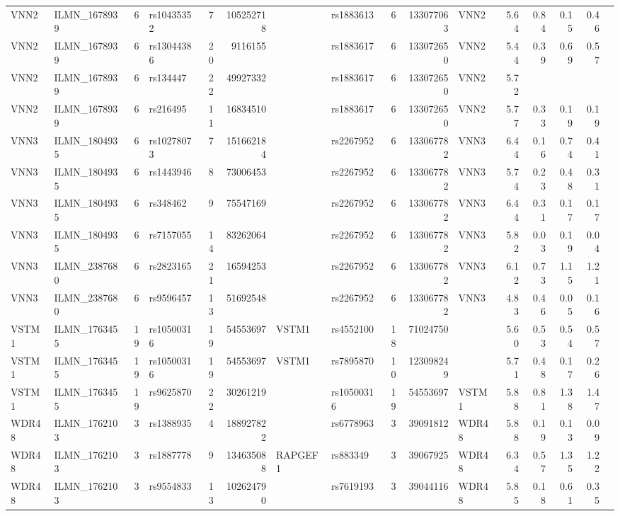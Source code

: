 \documentclass{article}
\begin{document}
\begin{landscape}
{\begin{ThreePartTable}
\begin{longtable}{|llr|lrrl|lrrl|rrrr|r|}
VNN2 & ILMN\_1678939 & 6 & rs10435352 & 7 & 105252718 &  & rs1883613 & 6 & 133077063 & VNN2 & 5.64 & 0.84 & 0.15 & 0.46 &  \\
VNN2 & ILMN\_1678939 & 6 & rs13044386 & 20 & 9116155 &  & rs1883617 & 6 & 133072650 & VNN2 & 5.44 & 0.39 & 0.69 & 0.57 &  \\
VNN2 & ILMN\_1678939 & 6 & rs134447 & 22 & 49927332 &  & rs1883617 & 6 & 133072650 & VNN2 & 5.72 &  &  &  &  \\
VNN2 & ILMN\_1678939 & 6 & rs216495 & 11 & 16834510 &  & rs1883617 & 6 & 133072650 & VNN2 & 5.77 & 0.33 & 0.19 & 0.19 &  \\
VNN3 & ILMN\_1804935 & 6 & rs10278073 & 7 & 151662184 &  & rs2267952 & 6 & 133067782 & VNN3 & 6.44 & 0.16 & 0.74 & 0.41 &  \\
VNN3 & ILMN\_1804935 & 6 & rs1443946 & 8 & 73006453 &  & rs2267952 & 6 & 133067782 & VNN3 & 5.74 & 0.23 & 0.48 & 0.31 &  \\
VNN3 & ILMN\_1804935 & 6 & rs348462 & 9 & 75547169 &  & rs2267952 & 6 & 133067782 & VNN3 & 6.44 & 0.31 & 0.17 & 0.17 &  \\
VNN3 & ILMN\_1804935 & 6 & rs7157055 & 14 & 83262064 &  & rs2267952 & 6 & 133067782 & VNN3 & 5.82 & 0.03 & 0.19 & 0.04 &  \\
VNN3 & ILMN\_2387680 & 6 & rs2823165 & 21 & 16594253 &  & rs2267952 & 6 & 133067782 & VNN3 & 6.12 & 0.73 & 1.15 & 1.21 &  \\
VNN3 & ILMN\_2387680 & 6 & rs9596457 & 13 & 51692548 &  & rs2267952 & 6 & 133067782 & VNN3 & 4.83 & 0.46 & 0.05 & 0.16 &  \\
VSTM1 & ILMN\_1763455 & 19 & rs10500316 & 19 & 54553697 & VSTM1 & rs4552100 & 18 & 71024750 &  & 5.60 & 0.53 & 0.54 & 0.57 &  \\
VSTM1 & ILMN\_1763455 & 19 & rs10500316 & 19 & 54553697 & VSTM1 & rs7895870 & 10 & 123098249 &  & 5.71 & 0.48 & 0.17 & 0.26 &  \\
VSTM1 & ILMN\_1763455 & 19 & rs9625870 & 22 & 30261219 &  & rs10500316 & 19 & 54553697 & VSTM1 & 5.88 & 0.81 & 1.38 & 1.47 &  \\
WDR48 & ILMN\_1762103 & 3 & rs1388935 & 4 & 188927822 &  & rs6778963 & 3 & 39091812 & WDR48 & 5.88 & 0.19 & 0.13 & 0.09 &  \\
WDR48 & ILMN\_1762103 & 3 & rs1887778 & 9 & 134635088 & RAPGEF1 & rs883349 & 3 & 39067925 & WDR48 & 6.34 & 0.57 & 1.35 & 1.22 &  \\
WDR48 & ILMN\_1762103 & 3 & rs9554833 & 13 & 102624790 &  & rs7619193 & 3 & 39044116 & WDR48 & 5.85 & 0.18 & 0.61 & 0.35 &  \\

\end{longtable}
\end{ThreePartTable}}
\end{landscape}
\end{document}
